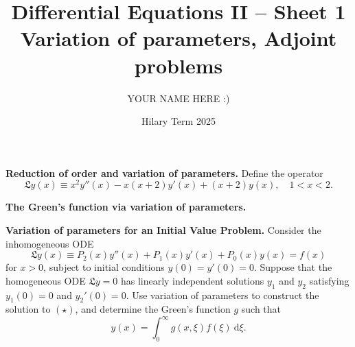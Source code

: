 \documentclass[answers]{exam}
\title{Differential Equations II -- Sheet 1\\Variation of parameters, Adjoint problems}
\author{YOUR NAME HERE :)}
\date{Hilary Term 2025}
\begin{document}
\maketitle
\begin{questions}

\question%
\textbf{Reduction of order and variation of parameters.} Define the operator \[
	\mathfrak{L} y(x) \equiv x^{2} y''(x)-x(x+2) y'(x)+(x+2) y(x), \quad 1<x<2.
\]



\question%
\textbf{The Green's function via variation of parameters.}



\question%
\textbf{Variation of parameters for an Initial Value Problem.} Consider the inhomogeneous ODE \[
	\mathfrak{L} y(x) \equiv P_{2}(x) y''(x)+P_{1}(x) y'(x)+P_{0}(x) y(x)=f(x) \tag{$\star$}
\] for $x>0$, subject to initial conditions $y(0)=y'(0)=0$. Suppose that the homogeneous ODE $\mathfrak{L} y=0$ has linearly independent solutions $y_{1}$ and $y_{2}$ satisfying $y_{1}(0)=0$ and $y_{2}'(0)=0$. Use variation of parameters to construct the solution to $(\star)$, and determine the Green's function $g$ such that \[
	y(x)=\int_{0}^{\infty} g(x, \xi) f(\xi) ~\mathrm{d} \xi .
\]




\end{questions}
\end{document}

